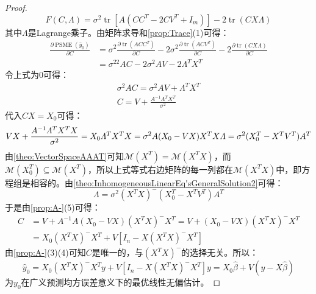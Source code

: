 \begin{proof}
\begin{equation*}
		F(C,\varLambda)=\sigma^2\operatorname{tr}[A(CC^T-2CV^T+I_m)]-2\operatorname{tr}(CX\varLambda)
	\end{equation*}
	其中$\varLambda$是Lagrange乘子。由矩阵求导和\cref{prop:Trace}(1)可得：
	\begin{align*}
		\frac{\partial\operatorname{PSME}(\hat{y}_0)}{\partial C}&=\sigma^2\frac{\partial\operatorname{tr}(ACC^T)}{\partial C}-2\sigma^2\frac{\partial\operatorname{tr}(ACV^T)}{\partial C}-2\frac{\partial\operatorname{tr}(CX\varLambda)}{\partial C} \\
		&=\sigma^22AC-2\sigma^2AV-2\varLambda^TX^T
	\end{align*}
	令上式为$0$可得：
	\begin{gather*}
		\sigma^2AC=\sigma^2AV+\varLambda^TX^T \\
		C=V+\frac{A^{-1}\varLambda^TX^T}{\sigma^2}
	\end{gather*}
	代入$CX=X_0$可得：
	\begin{equation*}
		VX+\frac{A^{-1}\varLambda^TX^TX}{\sigma^2}=X_0 \\
		\varLambda^TX^TX=\sigma^2A(X_0-VX) \\
		X^TX\varLambda=\sigma^2(X_0^T-X^TV^T)A^T
	\end{equation*}
	由\cref{theo:VectorSpaceAAAT}可知$\mathcal{M}(X^T)=\mathcal{M}(X^TX)$，而$\mathcal{M}(X_0^T)\subseteq\mathcal{M}(X^T)$，所以上式等式右边矩阵的每一列都在$\mathcal{M}(X^TX)$中，即方程组是相容的。由\cref{theo:InhomogeneousLinearEq'sGeneralSolution2}可得：
	\begin{equation*}
		\varLambda=\sigma^2(X^TX)^-(X_0^T-X^TV^T)A^T
	\end{equation*}
	于是由\cref{prop:A-}(5)可得：
	\begin{align*}
		C&=V+A^{-1}A(X_0-VX)(X^TX)^-X^T=V+(X_0-VX)(X^TX)^-X^T \\
		&=X_0(X^TX)^-X^T+V[I_n-X(X^TX)^-X^T]
	\end{align*}
	由\cref{prop:A-}(3)(4)可知$C$是唯一的，与$(X^TX)^-$的选择无关。所以：
	\begin{equation*}
		\hat{y}_0=X_0(X^TX)^-X^Ty+V[I_n-X(X^TX)^-X^T]y=X_0\hat{\beta}+V(y-X\hat{\beta})
	\end{equation*}
	为$y_0$在广义预测均方误差意义下的最优线性无偏估计。
\end{proof}
